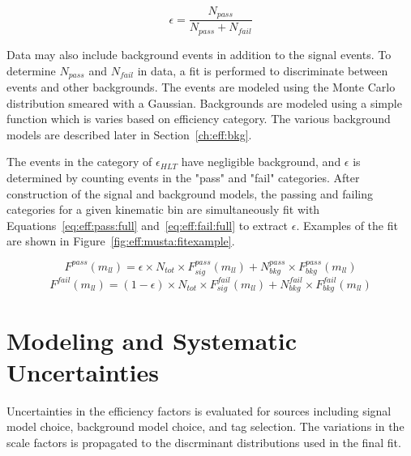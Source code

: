 \begin{equation}
\epsilon = \frac{N_{pass}}{N_{pass}+N_{fail}}
\label{eq:eff:eq}
\end{equation}

Data may also include background events in addition to the \zll signal events. To determine $N_{pass}$ and $N_{fail}$ in data, a fit is performed to discriminate between \zll events and other backgrounds. The \zll events are modeled using the Monte Carlo distribution smeared with a Gaussian. Backgrounds are modeled using a simple function which is varies based on efficiency category. The various background models are described later in Section~\ref{ch:eff:bkg}.

The events in the category of $\epsilon_{HLT}$ have negligible background, and $\epsilon$ is determined by counting events in the "pass" and "fail" categories.
After construction of the signal and background models, the passing and failing categories for a given kinematic bin are simultaneously fit with Equations~\ref{eq:eff:pass:full} and~\ref{eq:eff:fail:full} to extract $\epsilon$. Examples of the fit are shown in Figure~\ref{fig:eff:musta:fitexample}.

\begin{equation}
F^{pass}\left(m_{ll}\right)=\epsilon \times N_{tot} \times F_{sig}^{pass}\left(m_{ll} \right) + N^{pass}_{bkg} \times F_{bkg}^{pass} \left(m_{ll} \right)
\label{eq:eff:pass:full}
\end{equation}
\begin{equation}
F^{fail}\left(m_{ll}\right)=\left(1-\epsilon\right) \times N_{tot} \times F_{sig}^{fail}\left(m_{ll} \right) + N^{fail}_{bkg} \times F_{bkg}^{fail} \left(m_{ll} \right)
\label{eq:eff:fail:full}
\end{equation}





\section{Modeling and Systematic Uncertainties}\label{ch:eff:systematics}
Uncertainties in the efficiency factors is evaluated for sources including signal model choice, background model choice, and tag selection. The variations in the scale factors is propagated to the discrminant distributions used in the final fit.
